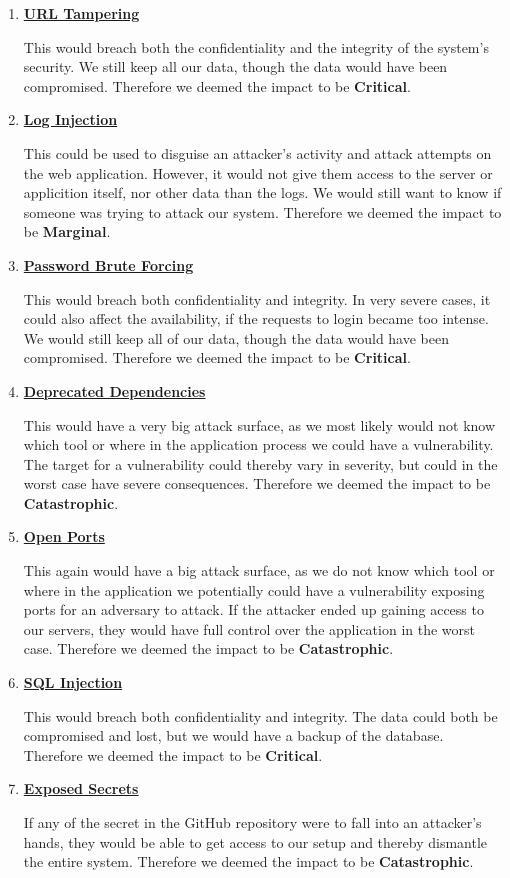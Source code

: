 \begin{enumerate}
    \item \textbf{\underline{URL Tampering}}

    This would breach both the confidentiality and the integrity of the system's security. We still keep all our data, though the data would have been compromised. Therefore we deemed the impact to be \textbf{Critical}.
    \item \textbf{\underline{Log Injection}}

    This could be used to disguise an attacker's activity and attack attempts on the web application. However, it would not give them access to the server or applicition itself, nor other data than the logs. We would still want to know if someone was trying to attack our system. Therefore we deemed the impact to be \textbf{Marginal}.
    \item \textbf{\underline{Password Brute Forcing}}

    This would breach both confidentiality and integrity. In very severe cases, it could also affect the availability, if the requests to login became too intense. We would still keep all of our data, though the data would have been compromised. Therefore we deemed the impact to be \textbf{Critical}.
    \item \textbf{\underline{Deprecated Dependencies}}

    This would have a very big attack surface, as we most likely would not know which tool or where in the application process we could have a vulnerability. The target for a vulnerability could thereby vary in severity, but could in the worst case have severe consequences. Therefore we deemed the impact to be \textbf{Catastrophic}.
    \item \textbf{\underline{Open Ports}}

    This again would have a big attack surface, as we do not know which tool or where in the application we potentially could have a vulnerability exposing ports for an adversary to attack. If the attacker ended up gaining access to our servers, they would have full control over the application in the worst case. Therefore we deemed the impact to be \textbf{Catastrophic}.
    \item \textbf{\underline{SQL Injection}}

    This would breach both confidentiality and integrity. The data could both be compromised and lost, but we would have a backup of the database. Therefore we deemed the impact to be \textbf{Critical}.
    \item \textbf{\underline{Exposed Secrets}}

    If any of the secret in the GitHub repository were to fall into an attacker's hands, they would be able to get access to our setup and thereby dismantle the entire system. Therefore we deemed the impact to be \textbf{Catastrophic}.
\end{enumerate}
